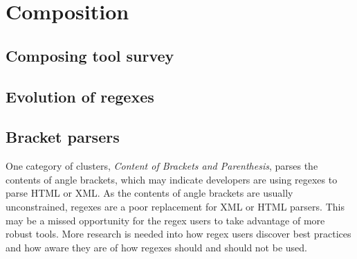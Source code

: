 \section{Composition}

\subsection{Composing tool survey}

\subsection{Evolution of regexes}

\subsection{Bracket parsers}
One category of clusters, \emph{Content of Brackets and Parenthesis}, parses the contents of angle brackets, which may indicate developers are using regexes to parse HTML or XML.  As the contents of angle brackets are usually unconstrained, regexes are a poor replacement for XML or HTML parsers.  This may be a missed opportunity for the regex users to take advantage of more robust tools. More research is needed into how regex users discover best practices and how aware they are of how regexes should and should not be used.
